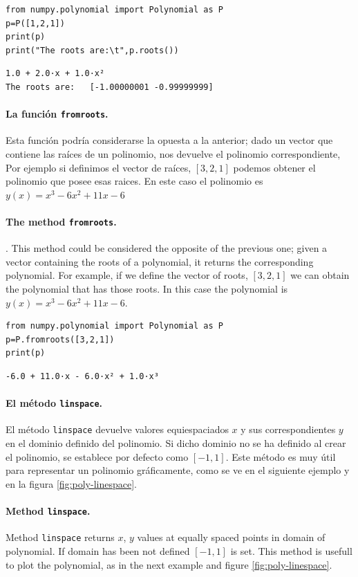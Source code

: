 \begin{verbatim}
from numpy.polynomial import Polynomial as P
p=P([1,2,1])
print(p)
print("The roots are:\t",p.roots())
\end{verbatim}
\begin{verbatim}
1.0 + 2.0·x + 1.0·x²
The roots are:	 [-1.00000001 -0.99999999]
\end{verbatim}
\begin{paracol}{2}
\paragraph{La función \texttt{fromroots}.} Esta función podría considerarse la opuesta a la anterior; dado un vector que contiene las raíces de un polinomio, nos devuelve el polinomio correspondiente, Por ejemplo si definimos el vector de raíces, $[3,2,1]$ podemos obtener el polinomio que posee esas raices. En este caso el polinomio es $y(x)=x^3-6x^2+11x-6$

\switchcolumn

\paragraph{The method \texttt{fromroots}.}. This method could be considered the opposite of the previous one; given a vector containing the roots of a polynomial, it returns the corresponding polynomial. For example, if we define the vector of roots, $[3,2,1]$ we can obtain the polynomial that has those roots. In this case the polynomial is $y(x)=x^3-6x^2+11x-6$.

\end{paracol}
\begin{verbatim}
from numpy.polynomial import Polynomial as P
p=P.fromroots([3,2,1])
print(p)
\end{verbatim}
\begin{verbatim}
-6.0 + 11.0·x - 6.0·x² + 1.0·x³
\end{verbatim}
\begin{paracol}{2}
\paragraph{El método \texttt{linspace}.}
El método  \texttt{linspace} devuelve valores equiespaciados $x$ y sus correspondientes $y$ en el dominio definido del polinomio. Si dicho dominio no se ha definido al crear el polinomio, se establece por defecto como $[-1,1]$. Este método es muy útil para representar un polinomio gráficamente, como se ve en el siguiente ejemplo y en la figura \ref{fig:poly-linespace}.

\switchcolumn

\paragraph{Method \texttt{linspace}.}
Method \texttt{linspace} returns $x$, $y$ values at equally spaced points in domain of polynomial. If domain has been not defined $[-1,1]$ is set. This method is usefull to plot the polynomial, as in the next example and figure \ref{fig:poly-linespace}.

\end{paracol}

